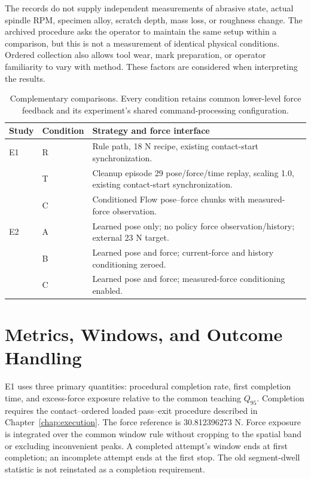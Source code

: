 The records do not supply independent measurements of abrasive state, actual spindle RPM, specimen alloy, scratch depth, mass loss, or roughness change. The archived procedure asks the operator to maintain the same setup within a comparison, but this is not a measurement of identical physical conditions. Ordered collection also allows tool wear, mark preparation, or operator familiarity to vary with method. These factors are considered when interpreting the results.

\begin{table}[tbp]\centering\small
\caption[E1/E2 comparison conditions]{Complementary comparisons. Every condition retains common lower-level force feedback and its experiment's shared command-processing configuration.}
\label{tab:expert_il_baselines}
\begin{tabularx}{\textwidth}{P{0.13\textwidth}p{0.16\textwidth}X}
\toprule Study & Condition & Strategy and force interface \\ \midrule
E1 & R & Rule path, 18 N recipe, existing contact-start synchronization. \\
 & T & Cleanup episode 29 pose/force/time replay, scaling 1.0, existing contact-start synchronization. \\
 & C & Conditioned Flow pose--force chunks with measured-force observation. \\
\midrule
E2 & A & Learned pose only; no policy force observation/history; external 23 N target. \\
 & B & Learned pose and force; current-force and history conditioning zeroed. \\
 & C & Learned pose and force; measured-force conditioning enabled. \\
\bottomrule
\end{tabularx}
\end{table}

\section{Metrics, Windows, and Outcome Handling}
E1 uses three primary quantities: procedural completion rate, first completion time, and excess-force exposure relative to the common teaching \(Q_{95}\). Completion requires the contact--ordered loaded pass--exit procedure described in Chapter~\ref{chap:execution}. The force reference is 30.812396273 N. Force exposure is integrated over the common window rule without cropping to the spatial band or excluding inconvenient peaks. A completed attempt's window ends at first completion; an incomplete attempt ends at the first stop. The old segment-dwell statistic is not reinstated as a completion requirement.

